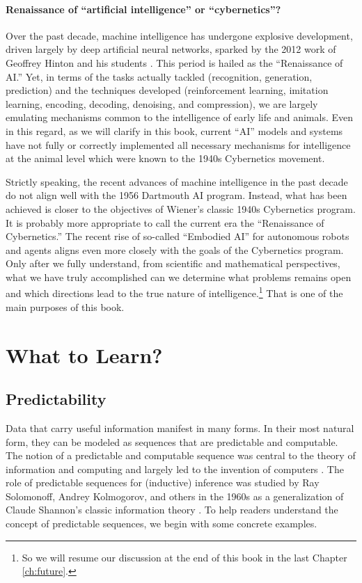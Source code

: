 \documentclass[../../book-main.tex]{subfiles}
\begin{document}
\paragraph{Renaissance of ``artificial intelligence'' or ``cybernetics''?}
Over the past decade, machine intelligence has undergone explosive
development, driven largely by deep artificial neural networks,
sparked by the 2012 work of Geoffrey Hinton and his students
\cite{krizhevsky2012imagenet}. This period is hailed as the
``Renaissance of AI.'' Yet, in terms of the tasks actually tackled
(recognition, generation, prediction) and the techniques developed
(reinforcement learning, imitation learning, encoding, decoding,
denoising, and compression), we are largely emulating mechanisms
common to the intelligence of early life and animals. Even in this
regard, as we will clarify in this book, current ``AI'' models and
systems have not fully or correctly implemented all necessary
mechanisms for intelligence at the animal level which were known to
the 1940s Cybernetics movement.

Strictly speaking, the recent advances of machine intelligence in the
past decade do not align well with the 1956 Dartmouth AI program.
Instead, what has been achieved is closer to the objectives of
Wiener's classic 1940s Cybernetics program. It is probably more
appropriate to call the current era the ``Renaissance of
Cybernetics.'' The recent rise of so-called ``Embodied AI'' for
autonomous robots and agents aligns even more closely with the goals of the
Cybernetics program. Only after we fully understand, from scientific
and mathematical perspectives, what we have truly accomplished can we
determine what problems remains open and which directions lead to the
true nature
of intelligence.\footnote{So we will resume our discussion at the end
of this book in the last Chapter \ref{ch:future}.} That is one of the
main purposes of this book.

\section{What to Learn?}
\label{sec:what-to-learn}

\subsection{Predictability}
\label{sec:predictability}
Data that carry useful information manifest in many forms. In their
most natural form, they can be modeled as sequences that are
predictable and computable. The notion of a predictable and
computable sequence was central to the theory of information \cite{Shannon-1948} 
and computing and largely led to the invention of computers \cite{Turing-1936}. The
role of predictable sequences for (inductive) inference was studied by
Ray Solomonoff, Andrey Kolmogorov, and others in the 1960s
\cite{Kolmogorov1998OnTO} as a generalization of Claude Shannon's
classic information theory \cite{Shannon-1948}. To help readers understand the
concept of predictable sequences, we begin with some concrete examples.
\end{document}
